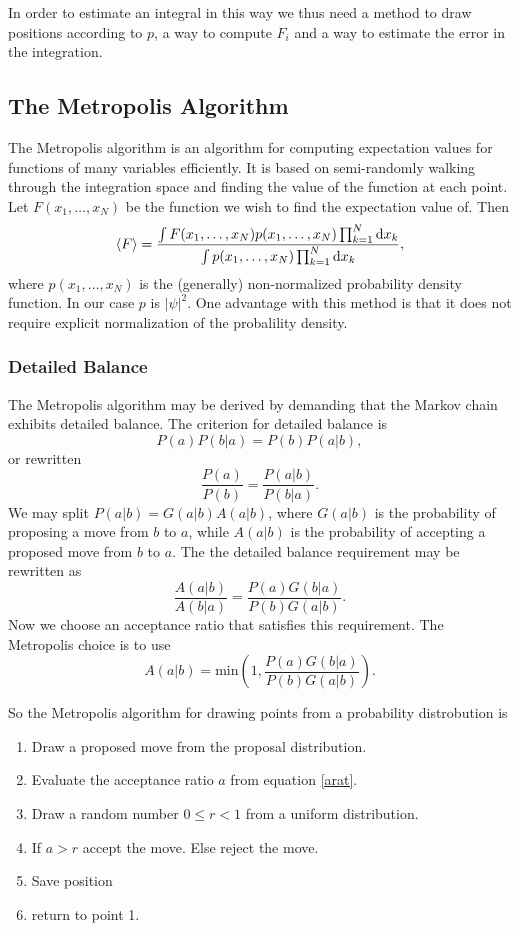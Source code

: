 \documentclass[a4paper,norsk,10pt]{article}
\newcommand{\dd}{\mathrm{d}}
\newcommand{\be}{\begin{equation}}
\newcommand{\ee}{\end{equation}}
\newcommand{\f}{\frac}
\renewcommand{\braket}{\Braket}
\begin{document}
In order to estimate an integral in this way we thus need a method to draw positions according to $p$,
a way to compute $F_i$ and a way to estimate the error in the integration.





\subsection{The Metropolis Algorithm}

The Metropolis algorithm is an algorithm for computing expectation values for functions of many variables efficiently.
It is based on semi-randomly walking through the integration space and finding the value of the function at each point.
Let \(F(x_1,\ldots,x_N)\) be the function we wish to find the expectation value of. Then
\be
\braket{F} = \f{\int F(x_1,\ldots,x_N)p(x_1,\ldots,x_N)\prod_{k=1}^N\dd x_k}{\int p(x_1,\ldots,x_N)\prod_{k=1}^N\dd x_k}, \label{exp}
\ee
where \(p(x_1,\ldots,x_N)\) is the (generally) non-normalized probability density function. In our case \(p\) is \(|\psi|^2\).
One advantage with this method is that it does not require explicit normalization of the probalility density.



\subsubsection{Detailed Balance}
The Metropolis algorithm may be derived by demanding that the Markov chain exhibits detailed balance.
The criterion for detailed balance is
\be
P(a)P(b|a) = P(b)P(a|b),
\ee
or rewritten
\be
\f{P(a)}{P(b)} = \f{P(a|b)}{P(b|a)}.
\ee
We may split \(P(a|b) = G(a|b)A(a|b)\), where \(G(a|b)\) is the probability of proposing a move from $b$ to $a$, while
$A(a|b)$ is the probability of accepting a proposed move from $b$ to $a$. The the detailed balance requirement may be rewritten as
\be
\f{A(a|b)}{A(b|a)} = \f{P(a)G(b|a)}{P(b)G(a|b)}.
\ee
Now we choose an acceptance ratio that satisfies this requirement. The Metropolis choice is to use
\be
A(a|b) = \mathrm{min}\left(1,\f{P(a)G(b|a)}{P(b)G(a|b)}\right).\label{arat}
\ee

So the Metropolis algorithm for drawing points from a probability distrobution is
\begin{enumerate}
\item
  Draw a proposed move from the proposal distribution.
\item
  Evaluate the acceptance ratio $a$ from equation \ref{arat}.
\item
  Draw a random number $0 \leq r < 1$ from a uniform distribution.
\item
  If $a>r$ accept the move. Else reject the move.
\item
  Save position
\item
  return to point 1.
\end{enumerate}
  
\end{document}
